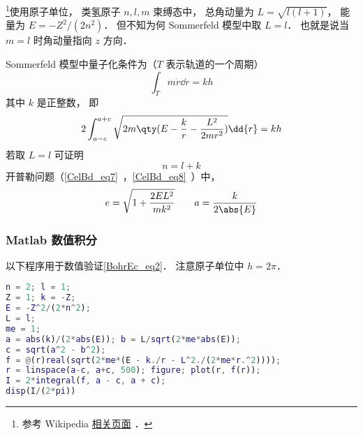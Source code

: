 
\begin{issues}
\issueDraft
\end{issues}

\footnote{参考 Wikipedia \href{https://en.wikipedia.org/wiki/Old_quantum_theory}{相关页面}
．}使用原子单位， 类氢原子 $n,l,m$ 束缚态中， 总角动量为 $L = \sqrt{l(l+1)}$， 能量为 $E = -Z^2/(2n^2)$． 但不知为何 Sommerfeld 模型中取 $L = l$． 也就是说当 $m = l$ 时角动量指向 $z$ 方向．

Sommerfeld 模型中量子化条件为（$T$ 表示轨道的一个周期）
\begin{equation}
\int_T m\dot r \dd{r} = kh
\end{equation}
其中 $k$ 是正整数， 即
\begin{equation}\label{BohrEc_eq1}
2\int_{a-c}^{a+c} \sqrt{2m\qty(E - \frac{k}{r} - \frac{L^2}{2mr^2})} \dd{r} = kh
\end{equation}
若取 $L = l$ 可证明
\begin{equation}\label{BohrEc_eq2}
n = l + k
\end{equation}
开普勒问题（\autoref{CelBd_eq7}~，\autoref{CelBd_eq8}~）中，
\begin{equation}
e = \sqrt{1 + \frac{2EL^2}{mk^2}}
\qquad
a = \frac{k}{2\abs{E}}
\end{equation}

\subsubsection{Matlab 数值积分}
以下程序用于数值验证\autoref{BohrEc_eq2}． 注意原子单位中 $h = 2\pi$．
\begin{lstlisting}[language=matlab]
n = 2; l = 1;
Z = 1; k = -Z;
E = -Z^2/(2*n^2);
L = l;
me = 1;
a = abs(k)/(2*abs(E)); b = L/sqrt(2*me*abs(E));
c = sqrt(a^2 - b^2);
f = @(r)real(sqrt(2*me*(E - k./r - L^2./(2*me*r.^2))));
r = linspace(a-c, a+c, 500); figure; plot(r, f(r));
I = 2*integral(f, a - c, a + c);
disp(I/(2*pi))
\end{lstlisting}
